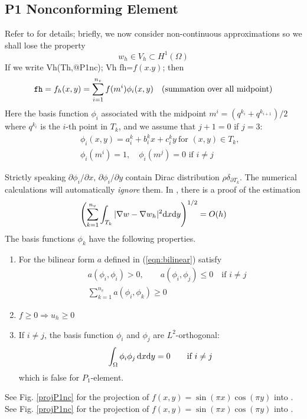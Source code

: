 \documentclass[a4paper,twoside,12pt]{book}
\def\d{\hbox{d}}
\def\p{\partial}
\begin{document}
\subsection{P1 Nonconforming Element}
Refer to \cite{Thomasset} for details; briefly, we now consider non-continuous approximations
so we shall lose the property
$$
w_h\in V_h\subset H^1(\Omega)
$$
If we write
\bFF
Vh(Th,@P1nc); Vh fh=$f(x.y)$;
\eFF
then
$$
\ttCC{fh}=f_h(x,y)=\sum_{i=1}^{n_v}f(m^i)\phi_i(x,y)\quad (\textrm{summation over all midpoint})
$$
Here the basis function $\phi_i$ associated with the midpoint
$m^i=(q^{k_i}+q^{k_{i+1}})/2$ where $q^{k_i}$ is the $i$-th point in $T_k$,
and we assume that $j+1=0$ if $j=3$:
\begin{eqnarray*}
&&\phi_i(x,y)=a^k_i+b^k_ix+c^k_iy~\textrm{for }(x,y)\in T_k,\\
&&\phi_i(m^i)=1,\quad \phi_i(m^j)=0\textrm{ if }i\neq j
\end{eqnarray*}

Strictly speaking $\p \phi_i/\p x,\, \p \phi_i/\p y$
contain Dirac distribution $\rho \delta_{\p T_k}$.
The numerical calculations will automatically \emph{ignore} them.
In \cite{Thomasset}, there is a proof of the estimation
\[
\left(\sum_{k=1}^{n_v}\int_{T_k}|\nabla w-\nabla w_h|^2\d x\d y\right)^{1/2}
=O(h)
\]
The basis functions $\phi_k$ have the following properties.
\begin{enumerate}
  \item
  For the bilinear form $a$ defined in (\ref{eqn:bilinear}) satisfy
  \begin{eqnarray*}
  &&a(\phi_i,\phi_i)>0,\qquad a(\phi_i,\phi_j)\le 0\quad\textrm{if }i\neq j\\
  &&\sum_{k=1}^{n_v}a(\phi_i,\phi_k)\ge 0
  \end{eqnarray*}
  \item
  $f\ge 0 \Rightarrow u_h\ge 0$
  \item If $i\neq j$, the basis function $\phi_i$ and $\phi_j$ are $L^2$-orthogonal:
  $$
  \int_{\Omega}\phi_i\phi_j\, \d x\d y=0\qquad \textrm{if }i\neq j
  $$
  which is false for $P_1$-element.
\end{enumerate}
See Fig. \ref{projP1nc} for the projection of $f(x,y)=\sin(\pi x)\cos(\pi y)$
into .
See Fig. \ref{projP1nc} for the projection of $f(x,y)=\sin(\pi x)\cos(\pi y)$
into .

\end{document}
